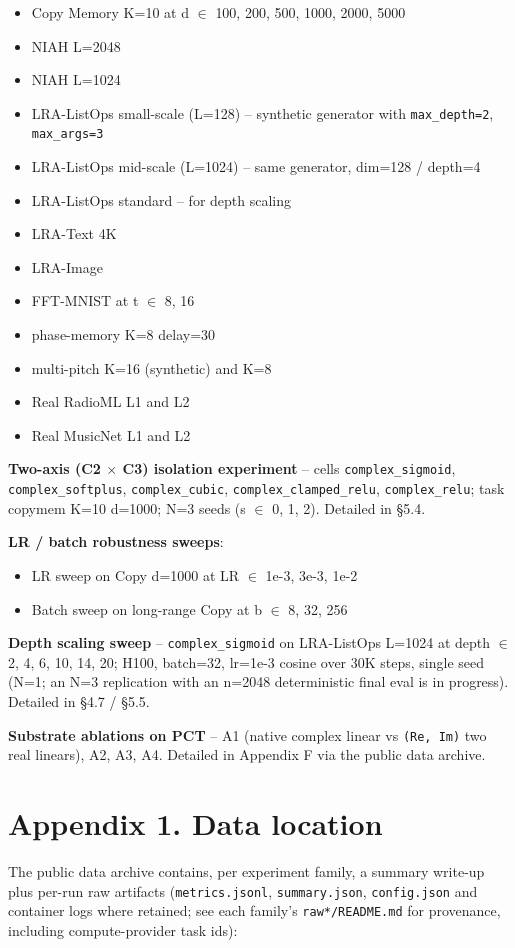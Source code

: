 \documentclass[11pt,a4paper]{article}
\theoremstyle{plain}
\theoremstyle{definition}
\begin{document}
\begin{itemize}
  \item Copy Memory K=10 at d $\in$ {100, 200, 500, 1000, 2000, 5000}
  \item NIAH L=2048
  \item NIAH L=1024
  \item LRA-ListOps small-scale (L=128) -- synthetic generator with \texttt{max\_depth=2}, \texttt{max\_args=3}
  \item LRA-ListOps mid-scale (L=1024) -- same generator, dim=128 / depth=4
  \item LRA-ListOps standard -- for depth scaling
  \item LRA-Text 4K
  \item LRA-Image
  \item FFT-MNIST at t $\in$ {8, 16}
  \item phase-memory K=8 delay=30
  \item multi-pitch K=16 (synthetic) and K=8
  \item Real RadioML L1 and L2
  \item Real MusicNet L1 and L2
\end{itemize}

\textbf{Two-axis (C2 $\times$ C3) isolation experiment} -- cells \texttt{complex\_sigmoid}, \texttt{complex\_softplus}, \texttt{complex\_cubic}, \texttt{complex\_clamped\_relu}, \texttt{complex\_relu}; task copymem K=10 d=1000; N=3 seeds (s $\in$ {0, 1, 2}). Detailed in \S{}5.4.

\textbf{LR / batch robustness sweeps}:

\begin{itemize}
  \item LR sweep on Copy d=1000 at LR $\in$ {1e-3, 3e-3, 1e-2}
  \item Batch sweep on long-range Copy at b $\in$ {8, 32, 256}
\end{itemize}

\textbf{Depth scaling sweep} -- \texttt{complex\_sigmoid} on LRA-ListOps L=1024 at depth $\in$ {2, 4, 6, 10, 14, 20}; H100, batch=32, lr=1e-3 cosine over 30K steps, single seed (N=1; an N=3 replication with an n=2048 deterministic final eval is in progress). Detailed in \S{}4.7 / \S{}5.5.

\textbf{Substrate ablations on PCT} -- A1 (native complex linear vs \texttt{(Re, Im)} two real linears), A2, A3, A4. Detailed in Appendix F via the public data archive.

\medskip

\section*{Appendix 1. Data location}
The public data archive contains, per experiment family, a summary write-up plus per-run raw artifacts (\texttt{metrics.jsonl}, \texttt{summary.json}, \texttt{config.json} and container logs where retained; see each family's \texttt{raw*/README.md} for provenance, including compute-provider task ids):
\end{document}
